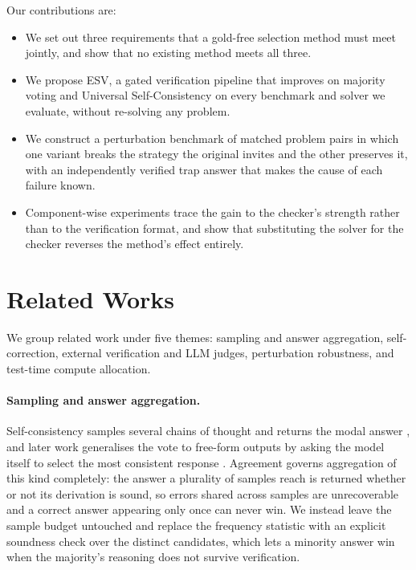 \documentclass[letterpaper]{article} %
\newcommand{\method}{\textsc{ESV}}   %
\begin{document}
Our contributions are:
\begin{itemize}
  \item We set out three requirements that a gold-free selection method must
        meet jointly, and show that no existing method meets all three.
  \item We propose \method{}, a gated verification pipeline that improves on
        majority voting and Universal Self-Consistency on every benchmark and
        solver we evaluate, without re-solving any problem.
  \item We construct a perturbation benchmark of matched problem pairs in which
        one variant breaks the strategy the original invites and the other
        preserves it, with an independently verified trap answer that makes the
        cause of each failure known.
  \item Component-wise experiments trace the gain to the checker's strength
        rather than to the verification format, and show that substituting the
        solver for the checker reverses the method's effect entirely.
\end{itemize}

\section{Related Works}
We group related work under five themes: sampling and answer
aggregation, self-correction, external verification and LLM judges,
perturbation robustness, and test-time compute allocation.

\paragraph{Sampling and answer aggregation.}
Self-consistency samples several chains of thought and returns the modal answer
\cite{wang2022self}, and later work generalises the vote to free-form
outputs by asking the model itself to select the most consistent response
\cite{chen2023universal}. Agreement governs aggregation of this kind
completely: the answer a plurality of samples reach is returned whether or not
its derivation is sound, so errors shared across samples are
unrecoverable and a correct answer appearing only once can never win. We instead
leave the sample budget untouched and replace the frequency
statistic with an explicit soundness check over the distinct candidates, which
lets a minority answer win when the majority's reasoning does not
survive verification.
\end{document}
